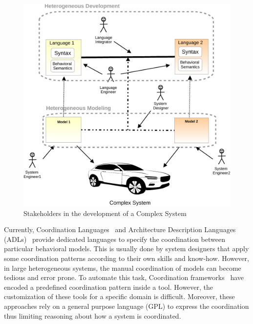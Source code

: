 \begin{figure}
	\begin{center}
		\includegraphics[width=1\textwidth]{introduction/stakeholders}
		\caption{Stakeholders in the development of a Complex System}
		\label{fig:stackeholders}
	\end{center}
\end{figure}
	
Currently, Coordination Languages~\cite{coordsignibib} and Architecture Description Languages (ADLs)~\cite{frameadlsbib} provide dedicated languages to specify the coordination between particular behavioral models. This is usually done by system designers that apply some coordination patterns according to their own skills and know-how. However, in large heterogeneous systems, the manual coordination of models can become tedious and error prone. To automate this task, Coordination frameworks~\cite{ptoleframebib,modhelxbib} have encoded a predefined coordination pattern inside a tool. However, the customization of these tools for a specific domain is difficult. Moreover, these approaches rely on a general purpose language (GPL) to express the coordination thus limiting reasoning about how a system is coordinated.  
	
